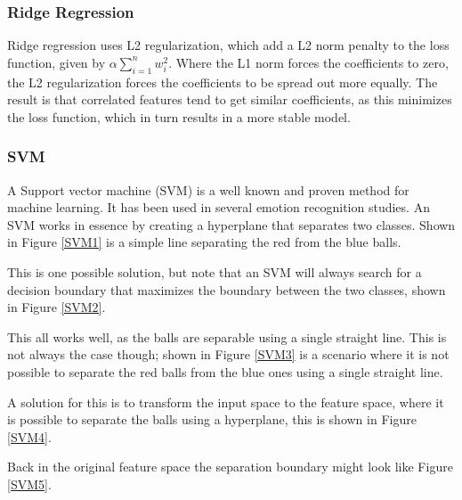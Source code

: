 \subsubsection{Ridge Regression}
Ridge regression uses L2 regularization, which add a L2 norm penalty to the loss function, given by $\alpha\sum\limits_{i=1}^{n} w_i^2$. Where the L1 norm forces the coefficients to zero, the L2 regularization forces the coefficients to be spread out more equally. The result is that correlated features tend to get similar coefficients, as this minimizes the loss function, which in turn results in a more stable model. 

\subsubsection{SVM}

A Support vector machine (SVM) is a well known and proven method for machine learning. It has been used in several emotion recognition studies. An SVM works in essence by creating a hyperplane that separates two classes. Shown in Figure \ref{SVM1} is a simple line separating the red from the blue balls.


This is one possible solution, but note that an SVM will always search for a decision boundary that maximizes the boundary between the two classes, shown in Figure \ref{SVM2}.


This all works well, as the balls are separable using a single straight line. This is not always the case though; shown in Figure \ref{SVM3} is a scenario where it is not possible to separate the red balls from the blue ones using a single straight line.


A solution for this is to transform the input space to the feature space, where it is possible to separate the balls using a hyperplane, this is shown in Figure \ref{SVM4}.


Back in the original feature space the separation boundary might look like Figure \ref{SVM5}.

